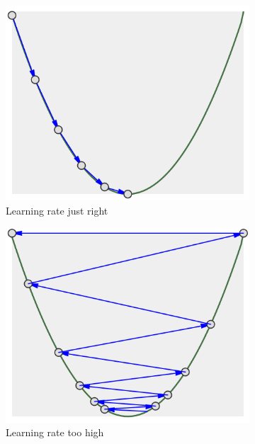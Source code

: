 \begin{figure}
    \centering
    \begin{subfigure}[b]{0.3\textwidth}
        \includegraphics[width=\textwidth]{images/lr_ok.png}
        \caption{Learning rate just right}
        \label{fig:lr_ok}
    \end{subfigure}
    \begin{subfigure}[b]{0.3\textwidth}
        \includegraphics[width=\textwidth]{images/lr_too_high.png}
        \caption{Learning rate too high}
        \label{fig:lr_too_high}
    \end{subfigure}
    \begin{subfigure}[b]{0.3\textwidth}

\end{subfigure}
\end{figure}
